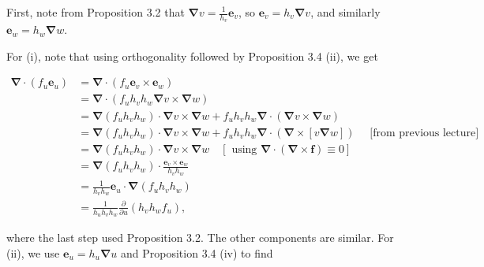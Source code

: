\begin{formalproof}

First, note from Proposition 3.2 that \(\boldsymbol{\nabla} v=\frac{1}{h_v} \boldsymbol{e}_v\), so \(\boldsymbol{e}_v=h_v \boldsymbol{\nabla} v\), and similarly \(\boldsymbol{e}_w=h_w \boldsymbol{\nabla} w\).

For (i), note that using orthogonality followed by Proposition 3.4 (ii), we get

\[
\begin{aligned}
\boldsymbol{\nabla} \cdot\left(f_u \boldsymbol{e}_u\right) & =\boldsymbol{\nabla} \cdot\left(f_u \boldsymbol{e}_v \times \boldsymbol{e}_w\right) \\
& =\boldsymbol{\nabla} \cdot\left(f_u h_v h_w \boldsymbol{\nabla} v \times \boldsymbol{\nabla} w\right) \\
& =\boldsymbol{\nabla}\left(f_u h_v h_w\right) \cdot \boldsymbol{\nabla} v \times \boldsymbol{\nabla} w+f_u h_v h_w \boldsymbol{\nabla} \cdot(\boldsymbol{\nabla} v \times \boldsymbol{\nabla} w) \\
& =\boldsymbol{\nabla}\left(f_u h_v h_w\right) \cdot \boldsymbol{\nabla} v \times \boldsymbol{\nabla} w+f_u h_v h_w \boldsymbol{\nabla} \cdot(\boldsymbol{\nabla} \times[v \boldsymbol{\nabla} w]) \quad \text { [from previous lecture] } \\
& =\boldsymbol{\nabla}\left(f_u h_v h_w\right) \cdot \boldsymbol{\nabla} v \times \boldsymbol{\nabla} w \quad[\text { using } \boldsymbol{\nabla} \cdot(\boldsymbol{\nabla} \times \boldsymbol{f}) \equiv 0] \\
& =\boldsymbol{\nabla}\left(f_u h_v h_w\right) \cdot \frac{\boldsymbol{e}_v \times \boldsymbol{e}_w}{h_v h_w} \\
& =\frac{1}{h_v h_w} \boldsymbol{e}_u \cdot \boldsymbol{\nabla}\left(f_u h_v h_w\right) \\
& =\frac{1}{h_u h_v h_w} \frac{\partial}{\partial u}\left(h_v h_w f_u\right),
\end{aligned}
\]

where the last step used Proposition 3.2. The other components are similar.
For (ii), we use \(\boldsymbol{e}_u=h_u \boldsymbol{\nabla} u\) and Proposition 3.4 (iv) to find


\end{formalproof}
